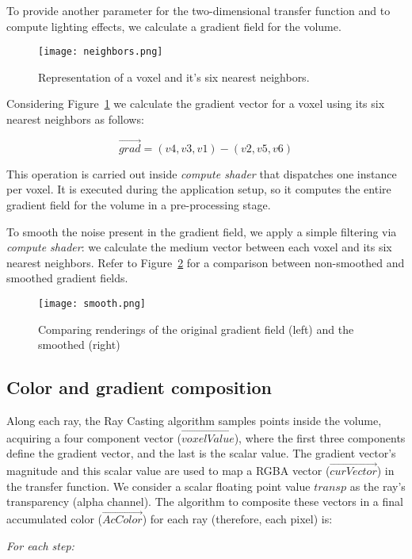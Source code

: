 \documentclass[10pt, conference]{IEEEtran}
\begin{document}
To provide another parameter for the two-dimensional transfer function and to compute lighting effects, we calculate a gradient field for the volume.

\begin{figure}[h]
\centering
\texttt{[image: neighbors.png]}
\caption{Representation of a voxel and it's six nearest neighbors.}
\label{fig:interp}
\end{figure}

Considering Figure~\ref{fig:interp} we calculate the gradient vector for a voxel using its six nearest neighbors as follows:

\[\vec{grad} = (v4,v3, v1)-(v2, v5, v6)\]

This operation is carried out inside \textit{compute shader} that dispatches one instance per voxel. It is executed during the application setup, so it computes the entire gradient field for the volume in a pre-processing stage.

To smooth the noise present in the gradient field, we apply a simple filtering via \textit{compute shader}: we calculate the medium vector between each voxel and its six nearest neighbors. Refer to Figure~\ref{fig:suave} for a comparison between non-smoothed and smoothed gradient fields.

\begin{figure}[h]
\centering
\texttt{[image: smooth.png]}
\caption{Comparing renderings of the original gradient field (left) and the smoothed (right)}
\label{fig:suave}
\end{figure}

\subsection{Color and gradient composition}
\label{sec:cgc}

Along each ray, the Ray Casting algorithm samples points inside the volume, acquiring a four component vector (\(\vec{voxelValue}\)), where the first three components define the gradient vector, and the last is the scalar value. The gradient vector's magnitude and this scalar value are used to map a RGBA vector (\(\vec{curVector}\)) in the transfer function. 
We consider a scalar floating point value \(transp\) as the ray's transparency (alpha channel).
The algorithm to composite these vectors in a final accumulated color (\(\vec{AcColor}\)) for each ray (therefore, each pixel) is:

\textit{For each step:}
\end{document}
